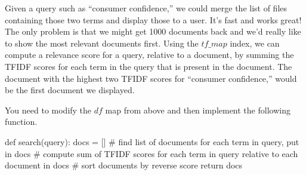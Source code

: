 \begin{fullwidth}
Given a query such as ``consumer confidence,'' we could merge the list of files containing those two terms and display those to a user. It's fast and works great! The only problem is that we might get 1000 documents back and we'd really like to show the most relevant documents first.  Using the $tf\_map$ index, we can compute a relevance score for a query, relative to a document, by summing the TFIDF scores for each term in the query that is present in the document. The document with the highest two TFIDF scores for ``consumer confidence,'' would be the first document we displayed.

You need to modify the $df$ map from above and then implement the following function.

\begin{pyverbatim}
def search(query):
    docs = []
    # find list of documents for each term in query, put in docs
    # compute sum of TFIDF scores for each term in query relative to each document in docs
    # sort documents by reverse score
    return docs
\end{pyverbatim}

\end{fullwidth}

